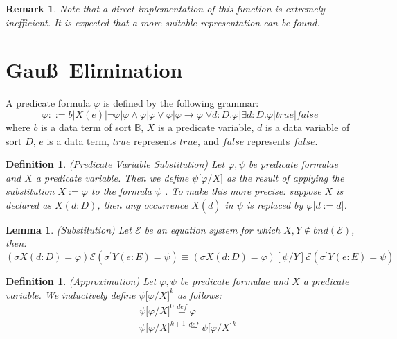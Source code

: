\documentclass{article}
\newtheorem{definition}[theorem]{Definition}
\newtheorem{lemma}[theorem]{Lemma}
\newtheorem{remark}[theorem]{Remark}
\begin{document}
\begin{remark}
Note that a direct implementation of this function is extremely inefficient.
It is expected that a more suitable representation can be found.
\end{remark}

\newpage

\section{Gau\ss\ Elimination}

A predicate formula $\varphi $ is defined by the following grammar:%
\begin{equation*}
\varphi ::=b|X(e)|\lnot \varphi |\varphi \wedge \varphi |\varphi \vee
\varphi |\varphi \rightarrow \varphi |\forall d:D.\varphi |\exists
d:D.\varphi |true |false
\end{equation*}%
where $b$ is a data term of sort $\mathbb{B}$, $X$ is a predicate variable, $%
d$ is a data variable of sort $D$, $e$ is a data term, $true $ represents $%
true$, and $false $ represents $false$.

\begin{definition}
(Predicate Variable Substitution) Let $\varphi ,\psi $ be predicate formulae
and $X$ a predicate variable. Then we define $\psi \lbrack \varphi /X]$ as
the result of applying the substitution $X:=\varphi $ to the formula $\psi $%
. To make this more precise: suppose $X$ is declared as $X(d:D)$, then any
occurrence $X(\overline{d})$ in $\psi $ is replaced by $\varphi \lbrack d:=%
\overline{d}]$.
\end{definition}

\begin{lemma}
(Substitution) Let $\mathcal{E}$ be an equation system for which $X,Y\notin
bnd(\mathcal{E})$, then:%
\begin{equation*}
(\sigma X(d:D)=\varphi )\mathcal{E}(\sigma ^{\prime }Y(e:E)=\psi )\equiv
(\sigma X(d:D)=\varphi )[\psi /Y]\mathcal{E}(\sigma ^{\prime }Y(e:E)=\psi )
\end{equation*}
\end{lemma}

\begin{definition}
(Approximation) Let $\varphi ,\psi $ be predicate formulae and $X$ a
predicate variable. We inductively define $\psi \lbrack \varphi /X]^{k}$ as
follows:%
\begin{eqnarray*}
&&\psi \lbrack \varphi /X]^{0}\overset{def}{=}\varphi \\
&&\psi \lbrack \varphi /X]^{k+1}\overset{def}{=}\psi \lbrack \varphi /X]^{k}
\end{eqnarray*}
\end{definition}
\end{document}
